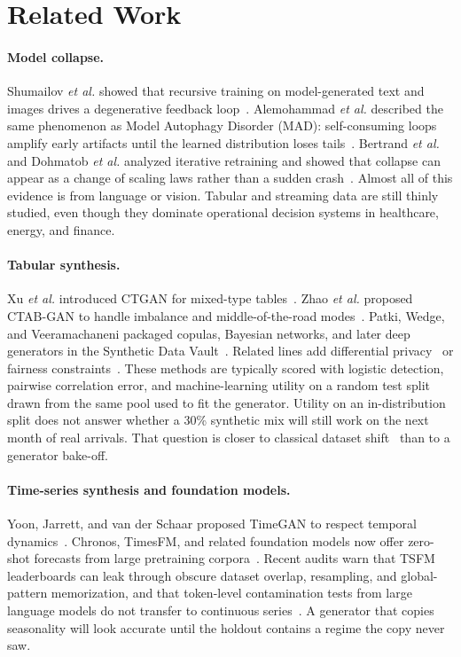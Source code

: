 \documentclass[conference]{IEEEtran}
\begin{document}
\section{Related Work}
\label{sec:related}
\paragraph{Model collapse.}
Shumailov \emph{et al.} showed that recursive training on model-generated text and images drives a degenerative feedback loop~\cite{shumailov2024collapse}.
Alemohammad \emph{et al.} described the same phenomenon as Model Autophagy Disorder (MAD): self-consuming loops amplify early artifacts until the learned distribution loses tails~\cite{alemohammad2024mad}.
Bertrand \emph{et al.} and Dohmatob \emph{et al.} analyzed iterative retraining and showed that collapse can appear as a change of scaling laws rather than a sudden crash~\cite{bertrand2024stability,dohmatob2024tails}.
Almost all of this evidence is from language or vision.
Tabular and streaming data are still thinly studied, even though they dominate operational decision systems in healthcare, energy, and finance.

\paragraph{Tabular synthesis.}
Xu \emph{et al.} introduced CTGAN for mixed-type tables~\cite{xu2019ctgan}.
Zhao \emph{et al.} proposed CTAB-GAN to handle imbalance and middle-of-the-road modes~\cite{zhao2021ctab}.
Patki, Wedge, and Veeramachaneni packaged copulas, Bayesian networks, and later deep generators in the Synthetic Data Vault~\cite{patki2016sdv}.
Related lines add differential privacy~\cite{jordon2019pategan} or fairness constraints~\cite{vanbreugel2021decaf}.
These methods are typically scored with logistic detection, pairwise correlation error, and machine-learning utility on a random test split drawn from the same pool used to fit the generator.
Utility on an in-distribution split does not answer whether a 30\% synthetic mix will still work on the next month of real arrivals.
That question is closer to classical dataset shift~\cite{quinonero2009shift} than to a generator bake-off.

\paragraph{Time-series synthesis and foundation models.}
Yoon, Jarrett, and van der Schaar proposed TimeGAN to respect temporal dynamics~\cite{yoon2019timegan}.
Chronos, TimesFM, and related foundation models now offer zero-shot forecasts from large pretraining corpora~\cite{ansari2024chronos,das2024timesfm}.
Recent audits warn that TSFM leaderboards can leak through obscure dataset overlap, resampling, and global-pattern memorization, and that token-level contamination tests from large language models do not transfer to continuous series~\cite{meyer2025leakage,li2026tsfmaudit}.
A generator that copies seasonality will look accurate until the holdout contains a regime the copy never saw.
\end{document}
